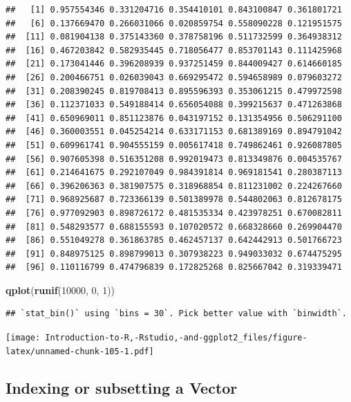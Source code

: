 \documentclass[]{book}
\newenvironment{Shaded}{\begin{snugshade}}{\end{snugshade}}
\newcommand{\DecValTok}[1]{\textcolor[rgb]{0.00,0.00,0.81}{#1}}
\newcommand{\KeywordTok}[1]{\textcolor[rgb]{0.13,0.29,0.53}{\textbf{#1}}}
\newcommand{\NormalTok}[1]{#1}
\begin{document}
\begin{verbatim}
##   [1] 0.957554346 0.331204716 0.354410101 0.843100847 0.361801721
##   [6] 0.137669470 0.266031066 0.020859754 0.558090228 0.121951575
##  [11] 0.081904138 0.375143360 0.378758196 0.511732599 0.364938312
##  [16] 0.467203842 0.582935445 0.718056477 0.853701143 0.111425968
##  [21] 0.173041446 0.396208939 0.937251459 0.844009427 0.614660185
##  [26] 0.200466751 0.026039043 0.669295472 0.594658989 0.079603272
##  [31] 0.208390245 0.819708413 0.895596393 0.353061215 0.479972598
##  [36] 0.112371033 0.549188414 0.656054088 0.399215637 0.471263868
##  [41] 0.650969011 0.851123876 0.043197152 0.131354956 0.506291100
##  [46] 0.360003551 0.045254214 0.633171153 0.681389169 0.894791042
##  [51] 0.609961741 0.904555159 0.005617418 0.749862461 0.926087805
##  [56] 0.907605398 0.516351208 0.992019473 0.813349876 0.004535767
##  [61] 0.214641675 0.292107049 0.984391814 0.969181541 0.280387113
##  [66] 0.396206363 0.381907575 0.318968854 0.811231002 0.224267660
##  [71] 0.968925687 0.723366139 0.501389978 0.544802063 0.812678175
##  [76] 0.977092903 0.898726172 0.481535334 0.423978251 0.670082811
##  [81] 0.548293577 0.688155593 0.107020572 0.668328660 0.269904470
##  [86] 0.551049278 0.361863785 0.462457137 0.642442913 0.501766723
##  [91] 0.848975125 0.898799013 0.307938223 0.949033032 0.674475295
##  [96] 0.110116799 0.474796839 0.172825268 0.825667042 0.319339471
\end{verbatim}

\begin{Shaded}
\begin{Highlighting}[]
\KeywordTok{qplot}\NormalTok{(}\KeywordTok{runif}\NormalTok{(}\DecValTok{10000}\NormalTok{, }\DecValTok{0}\NormalTok{, }\DecValTok{1}\NormalTok{))}
\end{Highlighting}
\end{Shaded}

\begin{verbatim}
## `stat_bin()` using `bins = 30`. Pick better value with `binwidth`.
\end{verbatim}

\texttt{[image: Introduction-to-R,-Rstudio,-and-ggplot2\_files/figure-latex/unnamed-chunk-105-1.pdf]}

\hypertarget{indexing-or-subsetting-a-vector}{%
\subsection{Indexing or subsetting a Vector}\label{indexing-or-subsetting-a-vector}}
\end{document}
